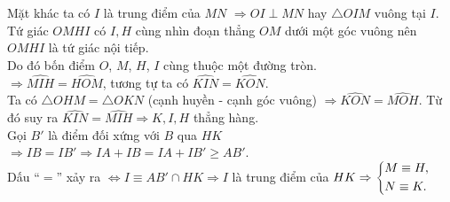 \begin{bt}
{		Mặt khác ta có $I$ là trung điểm của $MN$ $\Rightarrow OI \perp MN$ hay $\triangle OIM$ vuông tại $I$. \\
		Tứ giác $OMHI$ có $I,H$ cùng nhìn đoạn thẳng $OM$ dưới một góc vuông nên $OMHI$ là tứ giác nội tiếp. \\
		Do đó bốn điểm $O$, $M$, $H$, $I$ cùng thuộc một đường tròn.\\
		$ \Rightarrow \widehat{MIH} = \widehat{HOM}$, tương tự ta có $\widehat{KIN} = \widehat{KON}$. \\
		Ta có $\triangle OHM = \triangle OKN$ (cạnh huyền - cạnh góc vuông) $\Rightarrow \widehat{KON} = \widehat{MOH}$. Từ đó suy ra $\widehat{KIN} = \widehat{MIH} \Rightarrow K,I,H$ thẳng hàng. \\
		Gọi $B'$ là điểm đối xứng với $B$ qua $HK$ $\Rightarrow IB = IB' \Rightarrow IA + IB = IA + IB' \ge AB'$.\\
		 Dấu ``$=$'' xảy ra $\Leftrightarrow I \equiv AB' \cap HK \Rightarrow I$ là trung điểm của $HK \Rightarrow \left\{\begin{aligned}&M \equiv H, \\ &N \equiv K.\end{aligned}\right.$
}
\end{bt}


